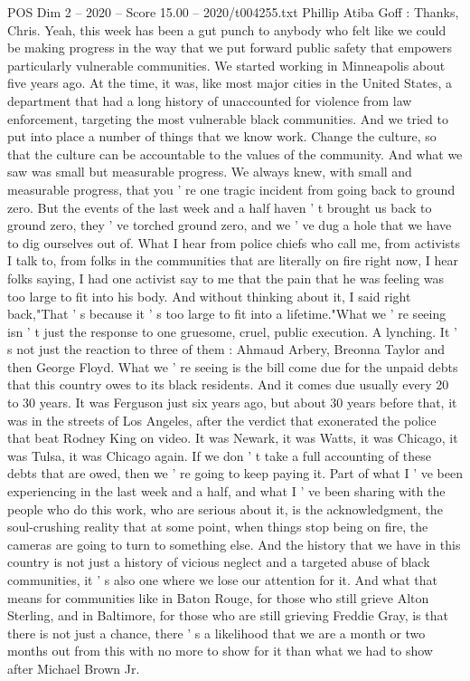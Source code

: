 \begin{textsample}{POS Dim 2 – 2020 – Score 15.00 – 2020/t004255.txt}
Phillip Atiba Goff : Thanks, Chris.
Yeah, this week has been a gut punch to anybody who felt like we could be making progress in the way that we put forward public safety that empowers particularly vulnerable communities.
We started working in Minneapolis about five years ago.
At the time, it was, like most major cities in the United States, a department that had a long history of unaccounted for violence from law enforcement, targeting the most vulnerable black communities.
And we tried to put into place a number of things that we know work.
Change the culture, so that the culture can be accountable to the values of the community.
And what we saw was small but measurable progress.
We always knew, with small and measurable progress, that you ' re one tragic incident from going back to ground zero.
But the events of the last week and a half haven ' t brought us back to ground zero, they ' ve torched ground zero, and we ' ve dug a hole that we have to dig ourselves out of.
What I hear from police chiefs who call me, from activists I talk to, from folks in the communities that are literally on fire right now, I hear folks saying, I had one activist say to me that the pain that he was feeling was too large to fit into his body.
And without thinking about it, I said right back,"That ' s because it ' s too large to fit into a lifetime."What we ' re seeing isn ' t just the response to one gruesome, cruel, public execution.
A lynching.
It ' s not just the reaction to three of them : Ahmaud Arbery, Breonna Taylor and then George Floyd.
What we ' re seeing is the bill come due for the unpaid debts that this country owes to its black residents.
And it comes due usually every 20 to 30 years.
It was Ferguson just six years ago, but about 30 years before that, it was in the streets of Los Angeles, after the verdict that exonerated the police that beat Rodney King on video.
It was Newark, it was Watts, it was Chicago, it was Tulsa, it was Chicago again.
If we don ' t take a full accounting of these debts that are owed, then we ' re going to keep paying it.
Part of what I ' ve been experiencing in the last week and a half, and what I ' ve been sharing with the people who do this work, who are serious about it, is the acknowledgment, the soul-crushing reality that at some point, when things stop being on fire, the cameras are going to turn to something else.
And the history that we have in this country is not just a history of vicious neglect and a targeted abuse of black communities, it ' s also one where we lose our attention for it.
And what that means for communities like in Baton Rouge, for those who still grieve Alton Sterling, and in Baltimore, for those who are still grieving Freddie Gray, is that there is not just a chance, there ' s a likelihood that we are a month or two months out from this with no more to show for it than what we had to show after Michael Brown Jr.

\end{textsample}
